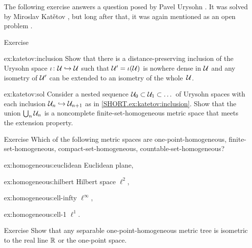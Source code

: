 The following exercise answers a question posed by Pavel Urysohn \cite[§$2(6)$]{urysohn}.
It was solved by Miroslav Katětov \cite{katetov},
but long after that, it was again mentioned as an open problem \cite[p. 83]{gromov-2007}.

\begin{thm}{Exercise}\label{ex:katetov}

\begin{subthm}{ex:katetov:inclusion}
Show that there is a distance-preserving inclusion of the Urysohn space $\iota\colon\mathcal{U}\hookrightarrow \mathcal{U}$ 
such that $\mathcal{U}'=\iota(\mathcal{U})$ is nowhere dense in $\mathcal{U}$ and any isometry of $\mathcal{U}'$ 
can be extended to an isometry of the whole~$\mathcal{U}$.
\end{subthm}

\begin{subthm}{ex:katetov:sol}
Consider a nested sequence $\mathcal{U}_0\subset \mathcal{U}_1\subset\dots$ of Urysohn spaces 
with each inclusion $\mathcal{U}_n\hookrightarrow \mathcal{U}_{n+1}$ as in \ref{SHORT.ex:katetov:inclusion}.
Show that the union $\bigcup_n\mathcal{U}_n$ is a noncomplete finite-set-homogeneous metric space that meets the extension property.
\end{subthm}

\end{thm}

{\sloppy

\begin{thm}{Exercise}\label{ex:homogeneous}
Which of the following metric spaces are 
one-point-homogeneous, finite-set-homogeneous, compact-set-homogeneous, countable-set-homogeneous?

\begin{subthm}{ex:homogeneous:euclidean}
Euclidean plane,
\end{subthm}

\begin{subthm}{ex:homogeneous:hilbert}
 Hilbert space $\ell^2$,
\end{subthm}

\begin{subthm}{ex:homogeneous:ell-infty}
 $\ell^\infty$,
\end{subthm}

\begin{subthm}{ex:homogeneous:ell-1}
 $\ell^1$.
\end{subthm}
\end{thm}

}

\begin{thm}{Exercise}\label{ex:homogeneous-tree}
Show that any separable one-point-homogeneous metric tree is isometric to the real line $\mathbb{R}$ or the one-point space.
\end{thm}


